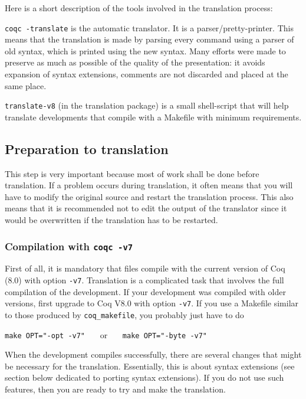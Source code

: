 \documentclass[11pt,a4paper]{article}
\begin{document}
Here is a short description of the tools involved in the translation process:
\begin{description}
\item{\tt coqc -translate}
is the automatic translator. It is a parser/pretty-printer. This means
that the translation is made by parsing every command using a parser
of old syntax, which is printed using the new syntax. Many efforts
were made to preserve as much as possible of the quality of the
presentation: it avoids expansion of syntax extensions, comments are
not discarded and placed at the same place.
\item{\tt translate-v8} (in the translation package) is a small
shell-script that will help translate developments that compile with a
Makefile with minimum requirements.
\end{description}

\subsection{Preparation to translation}

This step is very important because most of work shall be done before
translation. If a problem occurs during translation, it often means
that you will have to modify the original source and restart the
translation process. This also means that it is recommended not to
edit the output of the translator since it would be overwritten if
the translation has to be restarted.

\subsubsection{Compilation with {\tt coqc -v7}}

First of all, it is mandatory that files compile with the current
version of Coq (8.0) with option {\tt -v7}. Translation is a
complicated task that involves the full compilation of the
development. If your development was compiled with older versions,
first upgrade to Coq V8.0 with option {\tt -v7}. If you use a Makefile
similar to those produced by {\tt coq\_makefile}, you probably just
have to do

{\tt make OPT="-opt -v7"} ~~~or~~~ {\tt make OPT="-byte -v7"}

When the development compiles successfully, there are several changes
that might be necessary for the translation. Essentially, this is
about syntax extensions (see section below dedicated to porting syntax
extensions). If you do not use such features, then you are ready to
try and make the translation.
\end{document}
